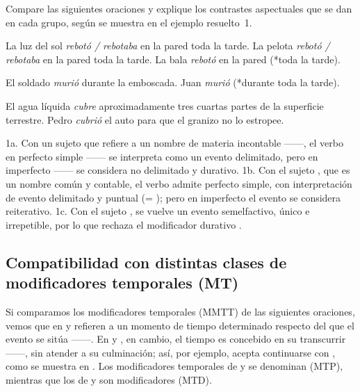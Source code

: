 \begin{ejercicio}\label{ej:08-sujeto}
Compare las siguientes oraciones y explique los contrastes aspectuales que se
dan en cada grupo, según se muestra en el ejemplo resuelto~1.

\begin{exe}
  \ex
    \begin{xlist}
      \ex La luz del sol \textit{rebotó / rebotaba} en la pared toda la tarde.
      \ex La pelota \textit{rebotó / rebotaba} en la pared toda la tarde.
      \ex La bala \textit{rebotó} en la pared (*toda la tarde).
    \end{xlist}
  \ex
    \begin{xlist}
      \ex El soldado \textit{murió} durante la emboscada.
      \ex Juan \textit{murió} (*durante toda la tarde).
    \end{xlist}
  \ex
    \begin{xlist}
      \ex El agua líquida \textit{cubre} aproximadamente tres cuartas partes de
          la superficie terrestre.
      \ex Pedro \textit{cubrió} el auto para que el granizo no lo estropee.
    \end{xlist}
\end{exe}

\begin{resuelto}
1a. Con un sujeto que refiere a un nombre de materia incontable ------, el verbo  en perfecto simple ------ se
interpreta como un evento delimitado, pero en imperfecto ------
se considera no delimitado y durativo. 1b. Con el sujeto , que
es un nombre común y contable, el verbo admite perfecto simple, con
interpretación de evento delimitado y puntual (= ); pero en
imperfecto el evento se considera reiterativo. 1c. Con el sujeto ,  se vuelve un evento semelfactivo, único e irrepetible,
por lo que rechaza el modificador durativo .
\end{resuelto}
\end{ejercicio}

\subsection{Compatibilidad con distintas clases de modificadores temporales (MT)}\label{sec:08-mt}

Si comparamos los modificadores temporales (MMTT) de las siguientes oraciones,
vemos que en  y  refieren a un momento
de tiempo determinado respecto del que el evento se sitúa ------. En  y
, en cambio, el tiempo es concebido en su transcurrir
------, sin atender a su culminación; así, por
ejemplo,  acepta continuarse con , como se muestra en . Los modificadores
temporales de  y  se denominan
 (MTP), mientras que los de  y
 son modificadores  (MTD).

